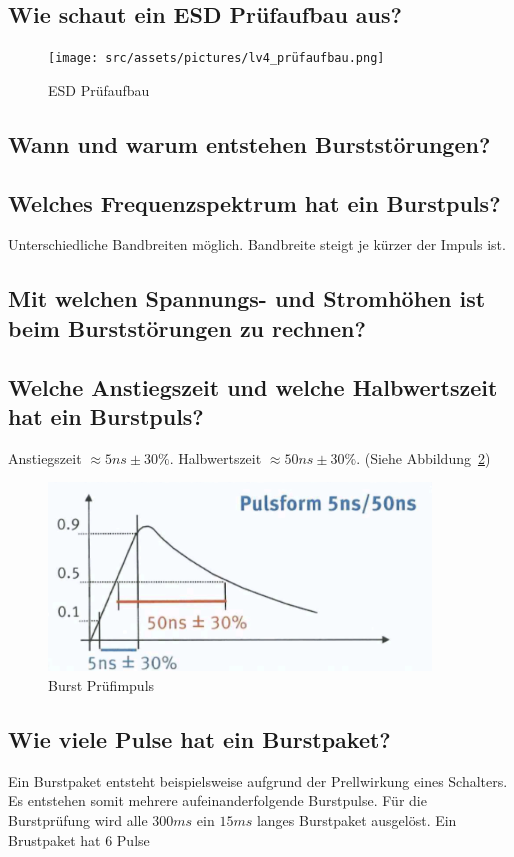 \subsection{Wie schaut ein ESD Prüfaufbau aus?}
\begin{figure}[!ht]
  \centering
  \texttt{[image: src/assets/pictures/lv4\_prüfaufbau.png]}
  \caption{ESD Prüfaufbau}\label{fig:lv4:esd_test}
\end{figure}

\subsection{Wann und warum entstehen Burststörungen?}

\subsection{Welches Frequenzspektrum hat ein Burstpuls?}
Unterschiedliche Bandbreiten möglich. Bandbreite steigt je kürzer der Impuls ist.

\subsection{Mit welchen Spannungs- und Stromhöhen ist beim Burststörungen zu rechnen?}

\subsection{Welche Anstiegszeit und welche Halbwertszeit hat ein Burstpuls?}
Anstiegszeit \(\approx 5ns \pm 30\%\). Halbwertszeit \(\approx 50ns \pm 30\%\). (Siehe Abbildung~\ref{fig:lv4:burst_impuls})

\begin{figure}
  \centering
  \includegraphics[height=5cm]{src/assets/pictures/lv4_burst_impuls.png}
  \caption{Burst Prüfimpuls}\label{fig:lv4:burst_impuls}
\end{figure}

\subsection{Wie viele Pulse hat ein Burstpaket?}
Ein Burstpaket entsteht beispielsweise aufgrund der Prellwirkung eines Schalters. Es entstehen somit mehrere aufeinanderfolgende Burstpulse.\p
Für die Burstprüfung wird alle \(300ms\) ein \(15ms\) langes Burstpaket ausgelöst. Ein Brustpaket hat \(6\) Pulse

